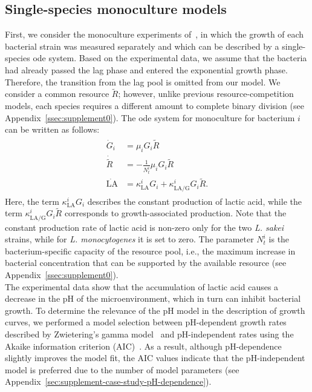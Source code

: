 \documentclass[10pt,1p,authoryear]{elsarticle}
\numberwithin{equation}{section}
\begin{document}
\subsection{Single-species monoculture models}
First, we consider the monoculture experiments of~\citet{ferrer-bustinsAntilisterialEffect2024}, in which the growth of each bacterial strain was measured separately and which can be described by a single-species \ac{ode} system.
Based on the experimental data, we assume that the bacteria had already passed the lag phase and entered the exponential growth phase.
Therefore, the transition from the lag pool is omitted from our model.
We consider a common resource $\tilde{R}$; however, unlike previous resource-competition models, each species requires a different amount to complete binary division (see Appendix~\ref{ssec:supplement0}).
The \ac{ode} system for monoculture for bacterium $i$ can be written as follows:
\begin{align}\begin{split}
    \dot G_i &= \mu_i G_i \tilde{R} \\
    \dot{\tilde{R}} &= - \frac{1}{N_t^i} \mu_i G_i \tilde{R}\\
    \dot{\mathrm{LA}} &= \kappa_\text{LA}^i G_i + \kappa_\text{LA/G}^i G_i \tilde{R}.
    \label{eq:case_study_ode_monoculture}
\end{split}\end{align}
Here, the term $\kappa_\text{LA}^i G_i$ describes the constant production of lactic acid, while the term $\kappa_\text{LA/G}^i G_i \tilde{R}$ corresponds to growth-associated production.
Note that the constant production rate of lactic acid is non-zero only for the two \textit{L. sakei} strains, while for \textit{L. monocytogenes} it is set to zero.
The parameter $N_t^i$ is the bacterium-specific capacity of the resource pool, i.e., the maximum increase in bacterial concentration that can be supported by the available resource (see Appendix~\ref{ssec:supplement0}).\\
%
The experimental data show that the accumulation of lactic acid causes a decrease in the pH of the microenvironment, which in turn can inhibit bacterial growth.
To determine the relevance of the pH model in the description of growth curves, we performed a model selection between pH-dependent growth rates described by Zwietering's gamma model~\citep{zwietering_decision_1992} and pH-independent rates using the Akaike information criterion (AIC)~\citep{akaike1100705}.
As a result, although pH-dependence slightly improves the model fit, the AIC values indicate that the pH-independent model is preferred due to the number of model parameters (see Appendix~\ref{sec:supplement-case-study-pH-dependence}).
\end{document}
